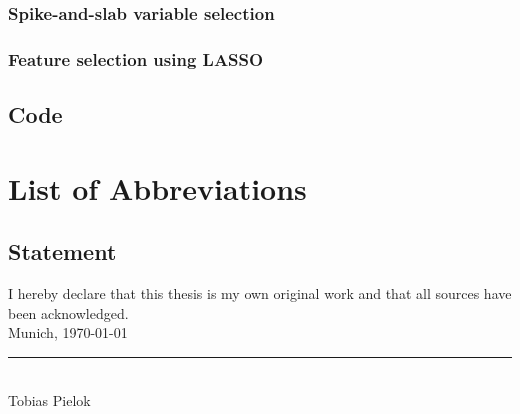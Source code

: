 \documentclass[12pt,letterpaper]{article}
\begin{document}
\subsubsection{Spike-and-slab variable selection}
\subsubsection{Feature selection using LASSO}
\pagebreak
\subsection{Code}
\pagebreak

\pagestyle{fancy}

 

\nocite{*} 
\clearpage

\listoffigures
{}
\clearpage


\section*{List of Abbreviations}
\begin{multicols}{2}
  \begin{acronym}[abr]
  \end{acronym}
\end{multicols}



\pagebreak
\subsection*{Statement}
\label{erklaerung}
\vspace*{0.5cm}
I hereby declare that this thesis is my own original work and that all sources have been acknowledged.\\[1.0cm]
Munich, \today \\[2.0cm]
\rule{6.0cm}{0.4pt} \\
Tobias Pielok
\end{document}
